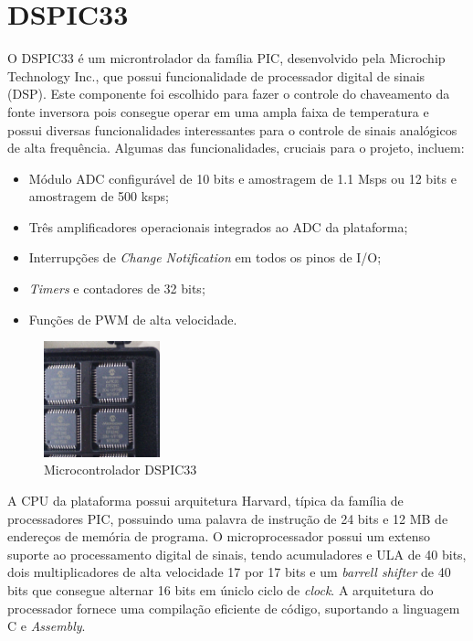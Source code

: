 \section{DSPIC33}
\label{sec:dsPIC}

O DSPIC33 é um microntrolador da família PIC, desenvolvido pela Microchip Technology Inc., que possui funcionalidade de processador digital de sinais (DSP). Este componente foi escolhido para fazer o controle do chaveamento da fonte inversora pois consegue operar em uma ampla faixa de temperatura e possui diversas funcionalidades interessantes para o controle de sinais analógicos de alta frequência. Algumas das funcionalidades, cruciais para o projeto, incluem:

\begin{itemize}
    \item Módulo ADC configurável de 10 bits e amostragem de 1.1 Msps ou 12 bits e amostragem de 500 ksps;
    \item Três amplificadores operacionais integrados ao ADC da plataforma;
    \item Interrupções de \textit{Change Notification} em todos os pinos de I/O;
    \item \textit{Timers} e contadores de 32 bits;
    \item Funções de PWM de alta velocidade.
\end{itemize} 

\begin{figure}[!htb]
    \centering
    \includegraphics[width=0.3\textwidth]{./dados/figuras/dspic}
    \caption{Microcontrolador DSPIC33}
    \label{fig:figura-dspic}
\end{figure}

A CPU da plataforma possui arquitetura Harvard, típica da família de processadores PIC, possuindo uma palavra de instrução de 24 bits e 12 MB de endereços de memória de programa. O microprocessador possui um extenso suporte ao processamento digital de sinais, tendo acumuladores e ULA de 40 bits, dois multiplicadores de alta velocidade 17 por 17 bits e um \textit{barrell shifter} de 40 bits que consegue alternar 16 bits em úniclo ciclo de \textit{clock}. A arquitetura do processador fornece uma compilação eficiente de código, suportando a linguagem C e \textit{Assembly}.

